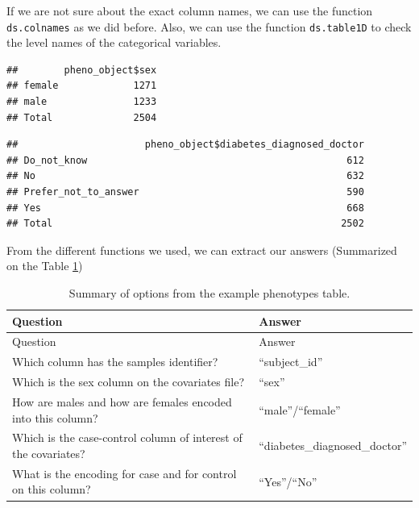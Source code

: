 \documentclass[
]{book}
\newenvironment{Shaded}{\begin{snugshade}}{\end{snugshade}}
\newcommand{\FunctionTok}[1]{\textcolor[rgb]{0.00,0.00,0.00}{#1}}
\newcommand{\NormalTok}[1]{#1}
\newcommand{\SpecialCharTok}[1]{\textcolor[rgb]{0.00,0.00,0.00}{#1}}
\newcommand{\StringTok}[1]{\textcolor[rgb]{0.31,0.60,0.02}{#1}}
\begin{document}
If we are not sure about the exact column names, we can use the function \texttt{ds.colnames} as we did before. Also, we can use the function \texttt{ds.table1D} to check the level names of the categorical variables.

\begin{Shaded}
\end{Shaded}

\begin{verbatim}
##        pheno_object$sex
## female             1271
## male               1233
## Total              2504
\end{verbatim}

\begin{Shaded}
\end{Shaded}

\begin{verbatim}
##                      pheno_object$diabetes_diagnosed_doctor
## Do_not_know                                             612
## No                                                      632
## Prefer_not_to_answer                                    590
## Yes                                                     668
## Total                                                  2502
\end{verbatim}

From the different functions we used, we can extract our answers (Summarized on the Table \ref{tab:tab3})

\begin{longtable}[]{@{}
  >{\raggedright\arraybackslash}p{}
  >{\raggedright\arraybackslash}p{}@{}}
\caption{\label{tab:tab3} Summary of options from the example phenotypes table.}\tabularnewline
\toprule
Question & Answer \\
\midrule
\endfirsthead
\toprule
Question & Answer \\
\midrule
\endhead
Which column has the samples identifier? & ``subject\_id'' \\
Which is the sex column on the covariates file? & ``sex'' \\
How are males and how are females encoded into this column? & ``male''/``female'' \\
Which is the case-control column of interest of the covariates? & ``diabetes\_diagnosed\_doctor'' \\
What is the encoding for case and for control on this column? & ``Yes''/``No'' \\
\bottomrule
\end{longtable}
\end{document}
